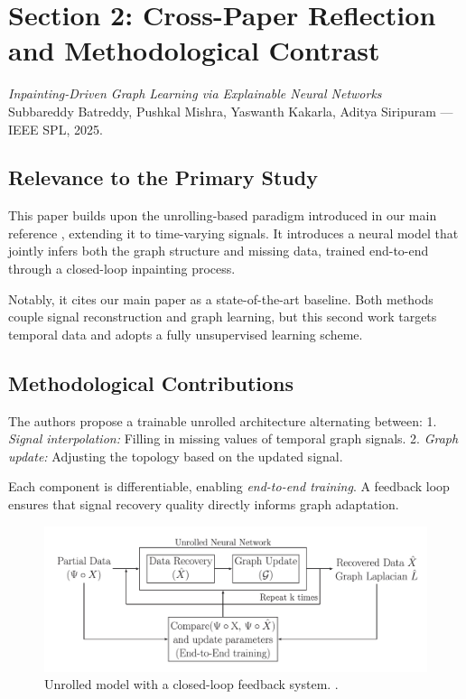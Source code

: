 \documentclass{article}
\theoremstyle{plain}
\theoremstyle{definition}
\theoremstyle{remark}
\begin{document}

\setcounter{section}{2}
\setcounter{subsection}{0}
\section*{Section 2: Cross-Paper Reflection and Methodological Contrast}

\textit{Inpainting-Driven Graph Learning via Explainable Neural Networks} \\
Subbareddy Batreddy, Pushkal Mishra, Yaswanth Kakarla, Aditya Siripuram — IEEE SPL, 2025.

\subsection{Relevance to the Primary Study}

This paper \cite{batreddy2025inpainting} builds upon the unrolling-based paradigm introduced in our main reference \cite{do2024interpretable}, extending it to time-varying signals. It introduces a neural model that jointly infers both the graph structure and missing data, trained end-to-end through a closed-loop inpainting process.

Notably, it cites our main paper as a state-of-the-art baseline. Both methods couple signal reconstruction and graph learning, but this second work targets temporal data and adopts a fully unsupervised learning scheme.

\subsection{Methodological Contributions}

The authors propose a trainable unrolled architecture alternating between:
1. \textit{Signal interpolation:} Filling in missing values of temporal graph signals.
2. \textit{Graph update:} Adjusting the topology based on the updated signal.

Each component is differentiable, enabling \textit{end-to-end training}. A feedback loop ensures that signal recovery quality directly informs graph adaptation.

\begin{figure}[h]
    \centering
    \vskip -0.1in
    \includegraphics[width=\linewidth]{paper2.png}
    \vskip -0.15in
    \caption{Unrolled model with a closed-loop feedback system. \cite{batreddy2025inpainting}.}
    \label{fig:paper2_model}
    \vskip -0.2in
\end{figure}
\end{document}
